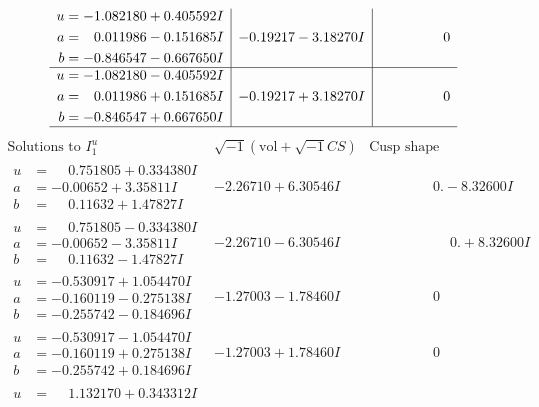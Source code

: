 \documentclass[1p]{elsarticle_modified}
\theoremstyle{definition}
\newcommand{\I}{\sqrt{-1}}
\begin{document}
$$\begin{array}{c|c|c}
\begin{aligned}
u &= -1.082180 + 0.405592 I \\
a &= \phantom{-}0.011986 - 0.151685 I \\
b &= -0.846547 - 0.667650 I\end{aligned}
 & -0.19217 - 3.18270 I & \phantom{-0.000000 } 0 \\ \hline\begin{aligned}
u &= -1.082180 - 0.405592 I \\
a &= \phantom{-}0.011986 + 0.151685 I \\
b &= -0.846547 + 0.667650 I\end{aligned}
 & -0.19217 + 3.18270 I & \phantom{-0.000000 } 0\\
 \hline 
 \end{array}$$\newpage$$\begin{array}{c|c|c}  
\text{Solutions to }I^u_{1}& \I (\text{vol} + \sqrt{-1}CS) & \text{Cusp shape}\\
 \hline 
\begin{aligned}
u &= \phantom{-}0.751805 + 0.334380 I \\
a &= -0.00652 + 3.35811 I \\
b &= \phantom{-}0.11632 + 1.47827 I\end{aligned}
 & -2.26710 + 6.30546 I & \phantom{-0.000000 } 0. - 8.32600 I \\ \hline\begin{aligned}
u &= \phantom{-}0.751805 - 0.334380 I \\
a &= -0.00652 - 3.35811 I \\
b &= \phantom{-}0.11632 - 1.47827 I\end{aligned}
 & -2.26710 - 6.30546 I & \phantom{-0.000000 -}0. + 8.32600 I \\ \hline\begin{aligned}
u &= -0.530917 + 1.054470 I \\
a &= -0.160119 - 0.275138 I \\
b &= -0.255742 - 0.184696 I\end{aligned}
 & -1.27003 - 1.78460 I & \phantom{-0.000000 } 0 \\ \hline\begin{aligned}
u &= -0.530917 - 1.054470 I \\
a &= -0.160119 + 0.275138 I \\
b &= -0.255742 + 0.184696 I\end{aligned}
 & -1.27003 + 1.78460 I & \phantom{-0.000000 } 0 \\ \hline\begin{aligned}
u &= \phantom{-}1.132170 + 0.343312 I \\

\end{aligned}
\end{array}$$
\end{document}
